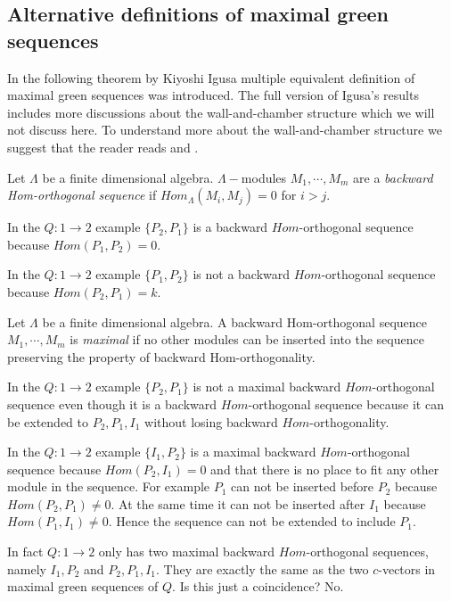 \subsection{Alternative definitions of maximal green sequences}
\indent In the following theorem by Kiyoshi Igusa multiple equivalent definition of maximal green sequences was introduced. The full version of Igusa's results includes more discussions about the wall-and-chamber structure which we will not discuss here. To understand more about the wall-and-chamber structure we suggest that the reader reads \cite{GHKK14}\cite{Mul15}\cite{BST17}\cite{BST18A}\cite{BST18B} and \cite{IOTW15}.
\begin{definition}
Let $\Lambda$ be a finite dimensional algebra. $\Lambda-$modules $M_1,\cdots,M_m$ are a \textit{backward Hom-orthogonal sequence} if $Hom_\Lambda(M_i,M_j)=0$ for $i>j$.
\end{definition}
\begin{example}
In the $Q:1\to 2$ example $\{P_2, P_1\}$ is a backward $Hom$-orthogonal sequence because $Hom(P_1, P_2) = 0$.
\end{example}
\begin{example}
In the $Q:1\to 2$ example $\{P_1, P_2\}$ is not a backward $Hom$-orthogonal sequence because $Hom(P_2, P_1) = k$.
\end{example}
\begin{definition}
Let $\Lambda$ be a finite dimensional algebra. A backward Hom-orthogonal sequence $M_1,\cdots,M_m$ is \textit{maximal} if no other modules can be inserted into the sequence preserving the property of backward Hom-orthogonality.
\end{definition}
\begin{example}
In the $Q:1\to 2$ example $\{P_2, P_1\}$ is not a maximal backward $Hom$-orthogonal sequence even though it is a backward $Hom$-orthogonal sequence because it can be extended to $P_2, P_1, I_1$ without losing backward $Hom$-orthogonality.
\end{example}
\begin{example}
In the $Q:1\to 2$ example $\{I_1, P_2\}$ is a maximal backward $Hom$-orthogonal sequence because $Hom(P_2, I_1) = 0$ and that there is no place to fit any other module in the sequence. For example $P_1$ can not be inserted before $P_2$ because $Hom(P_2, P_1)\neq 0$. At the same time it can not be inserted after $I_1$ because $Hom(P_1, I_1)\neq 0$. Hence the sequence can not be extended to include $P_1$.
\end{example}
\indent In fact $Q:1\to 2$ only has two maximal backward $Hom$-orthogonal sequences, namely $I_1,P_2$ and $P_2, P_1, I_1$. They are exactly the same as the two $c$-vectors in maximal green sequences of $Q$. Is this just a coincidence? No.
